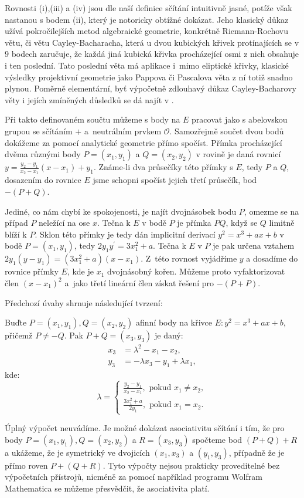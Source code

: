 \documentclass[12pt]{report}
\begin{document}
Rovnosti (i),(iii) a (iv) jsou dle naší definice sčítání intuitivně jasné, potíže však nastanou s bodem (ii), který je notoricky obtížné dokázat. Jeho klasický důkaz užívá pokročilejších metod algebraické geometrie, konkrétně Riemann-Rochovu větu, či větu Cayley-Bacharacha, která u dvou kubických křivek protínajících se v $9$ bodech zaručuje, že každá jiná kubická křivka procházející osmi z nich obsahuje i ten poslední. Tato poslední věta má aplikace i~mimo eliptické křivky, klasické výsledky projektivní geometrie jako Pappova či Pascalova věta z ní totiž snadno plynou. Poměrně elementární, byť výpočetně zdlouhavý důkaz Cayley-Bacharovy věty i jejích zmíněných důsledků se dá najít v \cite[Sec. 2.3]{Washington}.

Při takto definovaném součtu můžeme s body na $E$ pracovat jako s abelovskou grupou se sčítáním $+$ a~neutrálním prvkem $\mathcal{O}$. Samozřejmě součet dvou bodů dokážeme za pomocí analytické geometrie přímo spočíst. Přímka procházející dvěma různými body $P = (x_1,y_1)$ a $Q = (x_2,y_2)$ v rovině je daná rovnicí $y = \frac{y_2-y_1}{x_2-x_1} (x-x_1) + y_1$. Známe-li dva průsečíky této přímky s $E$, tedy $P$ a $Q$, dosazením do rovnice $E$ jsme schopni spočíst jejich třetí průsečík, bod $-(P+Q)$. 

Jediné, co nám chybí ke spokojenosti, je najít dvojnásobek bodu $P$, omezme se na případ $P$ neležící na ose $x$. Tečna k $E$ v bodě $P$ je přímka $PQ$, když se $Q$ limitně blíží k $P$. Sklon této přímky je tedy dán implicitní derivací $y^2 = x^3+ax+b$ v bodě $P = (x_1,y_1)$, tedy $2 y_1 y^\prime =3x_1 ^2 + a$. Tečna k $E$ v $P$ je pak určena vztahem $2y_1(y-y_1) = (3x_1 ^2+a)(x-x_1)$. Z~této rovnost vyjádříme $y$ a dosadíme do rovnice přímky $E$, kde je $x_1$ dvojnásobný kořen. Můžeme proto vyfaktorizovat člen $(x-x_1)^2$ a~jako třetí lineární člen získat řešení pro $-(P+P)$.

Předchozí úvahy shrnuje následující tvrzení:

\begin{veta}\label{sum}
Buďte $P = (x_1,y_1), Q = (x_2,y_2)$ afinní body na křivce $E : y^2 = x^3+ax+b$, přičemž $P \neq -Q$. Pak $P+Q = (x_3,y_3)$ je daný:
\begin{align*}
x_3 &= \lambda^2 - x_1 - x_2,\\
y_3 &= - \lambda x_3 - y_1 + \lambda x_1,
\end{align*}
kde:
\begin{equation*}
\lambda = \begin{cases}
\frac{y_2 - y_1}{x_2-x_1}, \text{ pokud } x_1 \neq x_2,\\
\frac{3x_1 ^2 + a}{2y_1}, \text{ pokud } x_1 = x_2.
\end{cases}
\end{equation*}

\end{veta}
Úplný výpočet neuvádíme. Je možné dokázat asociativitu sčítání i tím, že pro body $P = (x_1,y_1), Q = (x_2,y_2)$ a $R = (x_3,y_3)$ spočteme bod $(P+Q)+R$ a ukážeme, že je symetrický ve dvojicích $(x_1,x_3)$ a $(y_1,y_3)$, případně že je přímo roven $P+(Q+R)$. Tyto výpočty nejsou prakticky proveditelné bez výpočetních přístrojů, nicméně za pomocí například programu Wolfram Mathematica se můžeme přesvědčit, že asociativita platí.
\end{document}
